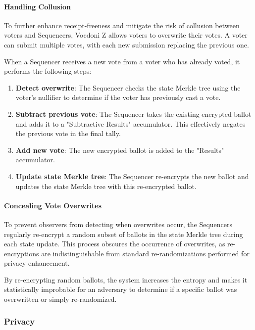 \paragraph{Handling Collusion}

To further enhance receipt-freeness and mitigate the risk of collusion between voters and Sequencers, Vocdoni Z allows voters to overwrite their votes. A voter can submit multiple votes, with each new submission replacing the previous one.

When a Sequencer receives a new vote from a voter who has already voted, it performs the following steps:

\begin{enumerate}
	\item \textbf{Detect overwrite}: The Sequencer checks the state Merkle tree using the voter's nullifier to determine if the voter has previously cast a vote.
	\item \textbf{Subtract previous vote}: The Sequencer takes the existing encrypted ballot and adds it to a "Subtractive Results" accumulator. This effectively negates the previous vote in the final tally.
	\item \textbf{Add new vote}: The new encrypted ballot is added to the "Results" accumulator.
	\item \textbf{Update state Merkle tree}: The Sequencer re-encrypts the new ballot and updates the state Merkle tree with this re-encrypted ballot.
\end{enumerate}

\paragraph{Concealing Vote Overwrites}

To prevent observers from detecting when overwrites occur, the Sequencers regularly re-encrypt a random subset of ballots in the state Merkle tree during each state update. This process obscures the occurrence of overwrites, as re-encryptions are indistinguishable from standard re-randomizations performed for privacy enhancement.

By re-encrypting random ballots, the system increases the entropy and makes it statistically improbable for an adversary to determine if a specific ballot was overwritten or simply re-randomized.

\subsubsection{Privacy}

